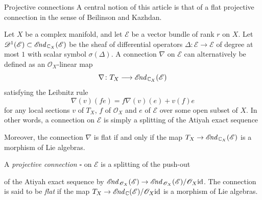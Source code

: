 \documentclass[english,10pt]{amsart}
\makeatletter
\renewcommand\subsection{\@startsection{subsection}{2}%
  \z@{.5\linespacing\@plus.7\linespacing}{-.5em}%
  {\normalfont\sffamily}}
\newcommand{\sD}{\mathscr{D}}
\newcommand{\sE}{\mathscr{E}}
\newcommand{\sO}{\mathscr{O}}
\theoremstyle{definition}
\theoremstyle{remark}
\numberwithin{equation}{section}
\makeatother
\begin{document}
\subsection{Projective connections} A central notion of this article is that of a flat projective connection in the sense of Beilinson and Kazhdan. 

Let $X$ be a complex manifold, and let $\sE$ be a vector bundle of rank $r$ on $X$. Let $\sD^1(\sE) \subset \sE\hspace{-0.07cm}\textit{nd}_{\,\mathbb{C}_X}(\sE)$ be the sheaf of differential operators $\Delta\colon \sE \to \sE$ of degree at most $1$ with scalar symbol $\sigma(\Delta)$. A connection $\nabla$ on $\sE$ can alternatively be defined as an $\sO_X$-linear map
\[
\nabla \colon T_X \longrightarrow  \sE\hspace{-0.07cm}\textit{nd}_{\,\mathbb{C}_X}(\sE)
\]
satisfying the Leibnitz rule 
\[
\nabla (v) (fe)=f\nabla (v) (e)+v(f) e
\] 
for any local sections $v$ of $T_X$, $f$ of $\sO_X$ and $e$ of $\sE$ over some open subset of $X$. In other words, a connection on $\sE$ is simply a splitting of the Atiyah exact sequence
\begin{center}
\end{center}
Moreover, the connection $\nabla$ is flat if and only if the map $T_X \to \sE\hspace{-0.07cm}\textit{nd}_{\,\mathbb{C}_X}(\sE)$ is a morphism of Lie algebras.

\medskip

A \textit{projective connection} $\square$ on $\sE$ is a splitting of the push-out 
\begin{center}
\end{center}
of the Atiyah exact sequence by $\sE\hspace{-0.07cm}\textit{nd}_{\,\sO_X}(\sE) \to \sE\hspace{-0.07cm}\textit{nd}_{\,\sO_X}(\sE)/\sO_X \textup{id}$. The connection is said to be \textit{flat} if the map $T_X \to \sE\hspace{-0.07cm}\textit{nd}_{\,\mathbb{C}}(\sE) / \sO_X \textup{id}$ is a morphism of Lie algebras. 
\end{document}
